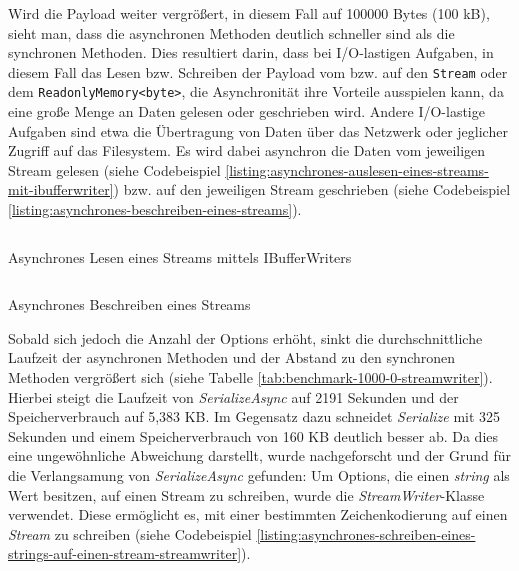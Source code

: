 Wird die Payload weiter vergrößert, in diesem Fall auf 100000 Bytes (100 kB), sieht man, dass die asynchronen Methoden deutlich schneller sind als die synchronen Methoden. Dies resultiert darin, dass bei I/O-lastigen Aufgaben, in diesem Fall das Lesen bzw. Schreiben der Payload vom bzw. auf den \texttt{Stream} oder dem \texttt{ReadonlyMemory<byte>}, die Asynchronität ihre Vorteile ausspielen kann, da eine große Menge an Daten gelesen oder geschrieben wird. Andere I/O-lastige Aufgaben sind etwa die Übertragung von Daten über das Netzwerk oder jeglicher Zugriff auf das Filesystem. Es wird dabei asynchron die Daten vom jeweiligen Stream gelesen (siehe Codebeispiel \ref{listing:asynchrones-auslesen-eines-streams-mit-ibufferwriter}) bzw. auf den jeweiligen Stream geschrieben (siehe Codebeispiel \ref{listing:asynchrones-beschreiben-eines-streams}).

\begin{listing}[h]
    \inputminted[framesep=2mm, baselinestretch=1.2, fontsize=\normalsize, linenos]{csharp}{codes/example_read_async_stream.cs}
    \caption{Asynchrones Lesen eines Streams mittels IBufferWriters}
    \label{listing:asynchrones-auslesen-eines-streams-mit-ibufferwriter}
\end{listing}

\begin{listing}[h]
    \inputminted[framesep=2mm, baselinestretch=1.2, fontsize=\normalsize, linenos]{csharp}{codes/example_write_async_stream.cs}
    \caption{Asynchrones Beschreiben eines Streams}
    \label{listing:asynchrones-beschreiben-eines-streams}
\end{listing}

Sobald sich jedoch die Anzahl der Options erhöht, sinkt die durchschnittliche Laufzeit der asynchronen Methoden und der Abstand zu den synchronen Methoden vergrößert sich (siehe Tabelle \ref{tab:benchmark-1000-0-streamwriter}). Hierbei steigt die Laufzeit von \textit{SerializeAsync} auf 2191 Sekunden und der Speicherverbrauch auf 5,383 KB. Im Gegensatz dazu schneidet \textit{Serialize} mit 325 Sekunden und einem Speicherverbrauch von 160 KB deutlich besser ab. Da dies eine ungewöhnliche Abweichung darstellt, wurde nachgeforscht und der Grund für die Verlangsamung von \textit{SerializeAsync} gefunden: Um Options, die einen \textit{string} als Wert besitzen, auf einen Stream zu schreiben, wurde die \textit{StreamWriter}-Klasse verwendet. Diese ermöglicht es, mit einer bestimmten Zeichenkodierung auf einen \textit{Stream} zu schreiben (siehe Codebeispiel \ref{listing:asynchrones-schreiben-eines-strings-auf-einen-stream-streamwriter}).

